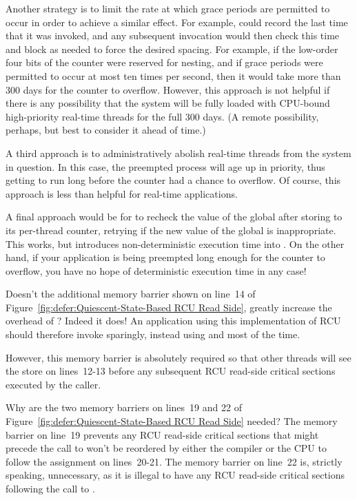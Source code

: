 	Another strategy is to limit the rate at which grace periods are
	permitted to occur in order to achieve a similar effect.
	For example,  could record the last time
	that it was invoked, and any subsequent invocation would then
	check this time and block as needed to force the desired
	spacing.
	For example, if the low-order four bits of the counter were
	reserved for nesting, and if grace periods were permitted to
	occur at most ten times per second, then it would take more
	than 300 days for the counter to overflow.
	However, this approach is not helpful if there is any possibility
	that the system will be fully loaded with CPU-bound high-priority
	real-time threads for the full 300 days.
	(A remote possibility, perhaps, but best to consider it ahead
	of time.)

	A third approach is to administratively abolish real-time threads
	from the system in question.
	In this case, the preempted process will age up in priority,
	thus getting to run long before the counter had a chance to
	overflow.
	Of course, this approach is less than helpful for real-time
	applications.

	A final approach would be for  to recheck
	the value of the global  after storing to its
	per-thread  counter, retrying if the new
	value of the global  is inappropriate.
	This works, but introduces non-deterministic execution time
	into .
	On the other hand, if your application is being preempted long
	enough for the counter to overflow, you have no hope of
	deterministic execution time in any case!


\QuickQ{}
	Doesn't the additional memory barrier shown on line~14 of
	Figure~\ref{fig:defer:Quiescent-State-Based RCU Read Side},
	greatly increase the overhead of ?
\QuickA{}
	Indeed it does!
	An application using this implementation of RCU should therefore
	invoke  sparingly, instead using
	 and  most of the
	time.

	However, this memory barrier is absolutely required so that
	other threads will see the store on lines~12-13 before any
	subsequent RCU read-side critical sections executed by the
	caller.

\QuickQ{}
	Why are the two memory barriers on lines~19 and 22 of
	Figure~\ref{fig:defer:Quiescent-State-Based RCU Read Side}
	needed?
\QuickA{}
	The memory barrier on line~19 prevents any RCU read-side
	critical sections that might precede the
	call to  won't be reordered by either
	the compiler or the CPU to follow the assignment on lines~20-21.
	The memory barrier on line~22 is, strictly speaking, unnecessary,
	as it is illegal to have any RCU read-side critical sections
	following the call to .

